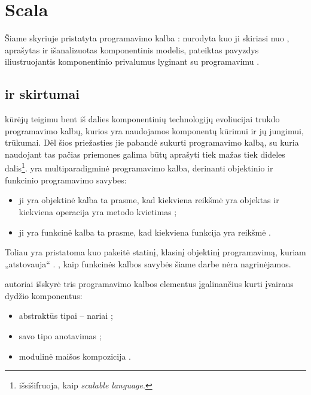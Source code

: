 \chapter{Scala}

Šiame skyriuje pristatyta programavimo kalba :
nurodyta kuo ji skiriasi nuo , aprašytas
ir išanalizuotas  komponentinis modelis,
pateiktas pavyzdys iliustruojantis  komponentinio
privalumus lyginant su programavimu .

\section{ ir  skirtumai}

 kūrėjų \cite[1]{scala-overview} teigimu bent iš
dalies komponentinių technologijų evoliucijai trukdo programavimo
kalbų, kurios yra naudojamos komponentų kūrimui ir jų jungimui,
trūkumai. Dėl šios priežasties jie pabandė sukurti programavimo
kalbą, su kuria naudojant tas pačias priemones galima būtų aprašyti
tiek mažas tiek dideles dalis\footnote{ išsišifruoja,
kaip \emph{scalable language}.}.  yra multiparadigminė
programavimo kalba, derinanti objektinio ir funkcinio programavimo
savybes:
\begin{itemize}
  \item ji yra objektinė kalba ta prasme, kad kiekviena reikšmė
     yra objektas ir kiekviena operacija yra metodo kvietimas
    \cite[3]{scala-overview};
  \item ji yra funkcinė kalba ta prasme, kad kiekviena funkcija yra
    reikšmė .
\end{itemize}
Toliau yra pristatoma kuo  pakeitė statinį, klasinį
objektinį programavimą, kuriam „atstovauja“ .
, kaip funkcinės kalbos savybės šiame darbe nėra
nagrinėjamos.

 autoriai \cite{scalable-component-abstractions}
išskyrė tris programavimo kalbos elementus įgalinančius kurti įvairaus
dydžio  komponentus:
\begin{itemize}
  \item abstraktūs tipai – nariai ;
  \item savo tipo anotavimas ;
  \item modulinė maišos kompozicija .
\end{itemize}

